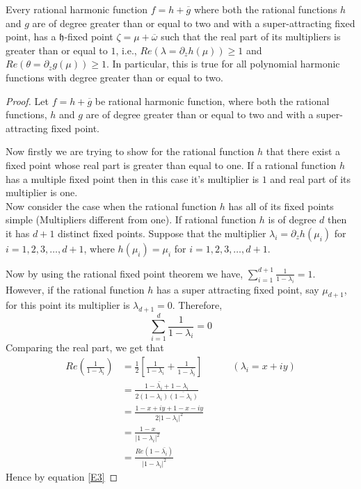 \documentclass[10pt,a4paper]{amsart}
\begin{document}
\begin{thm}\label{T1}


Every rational harmonic function $f=h+\overline{g}$ where both the rational functions $h$ and $g$ are of degree greater than or equal to two and with a super-attracting fixed point, has a $\mathfrak{h}$-fixed point  $\zeta=\mu+\overline{\omega}$ such that the real part of its multipliers is greater than or equal to $1$, i.e., $Re\left( \lambda=\partial_{z}h(\mu)\right)\geq 1$ and $Re\left( \theta=\partial_{z}g(\mu)\right)\geq 1$. In particular, this is true for all polynomial harmonic functions with degree greater than or equal to two.
    
\end{thm}

\begin{proof}

Let $f=h+\overline{g}$ be rational harmonic function, where both the rational functions, $h$ and $g$ are of degree greater than or equal to two and with a super-attracting fixed point. 



Now firstly we are trying to show for the rational function $h$ that there exist a fixed point whose real part is greater than equal to one. If a rational function $h$ has a multiple fixed point then in this case it's multiplier is $1$ and real part of its multiplier is one.\\

Now consider the case when the rational function $h$ has all of its fixed points simple (Multipliers different from one). If rational function $h$ is of degree $d$ then it has $d+1$ distinct fixed points. Suppose that the multiplier $\lambda_{i}=\partial_{z}h(\mu_{i})$ for $i=1,2,3,\ldots,d+1$, where $h(\mu_{i})=\mu_{i}$ for $i=1,2,3,\ldots, d+1.$ 

Now by  using the rational fixed point theorem we have, $\displaystyle\sum_{i=1}^{d+1}\frac{1}{1-\lambda_{i}}=1$. However, if the rational function $h$ has a super attracting fixed point, say $\mu_{d+1}$, for this point its multiplier is $\lambda_{d+1}=0$. Therefore,
\begin{equation}\label{E3}
\displaystyle\sum_{i=1}^{d}\frac{1}{1-\lambda_{i}}=0
\end{equation}
Comparing the real part, we get that
\begin{align*}
Re\left( \frac{1}{1-\lambda_{i}}\right)&=\frac{1}{2}\left[ \frac{1}{1-\lambda_{i}}+\frac{1}{1-\bar{\lambda_{i}}}\right]\quad\quad\quad(\lambda_{i}=x+iy) \\
&=\frac{1-\bar{\lambda_{i}}+1-\lambda_{i}}{2(1-\lambda_{i})\overline{(1-\lambda_{i})}}\\
&=\frac{1-x+iy+1-x-iy}{2{\vert 1-\lambda_{i}\vert}^{2}}\\
&=\frac{1-x}{{\vert 1-\lambda_{i}\vert}^{2}}\\
&=\frac{Re(1-\bar{\lambda_{i}})}{{\vert 1-\lambda_{i}\vert}^{2}}
\end{align*}
Hence by equation \ref{E3}


\end{proof}
\end{document}
